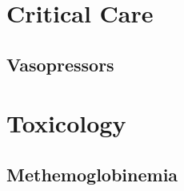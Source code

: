 \documentclass[10pt,openany]{book}
\begin{document}


\renewcommand{\contentsname}{\color{mainColor} Contents}
\tableofcontents

\twocolumn

\part{Critical Care}
	
\chapter{Vasopressors} \label{ch:vasopressors}


\part{Toxicology}

\chapter{Methemoglobinemia} \label{ch:methemoglobinemia}

	
\end{document}
